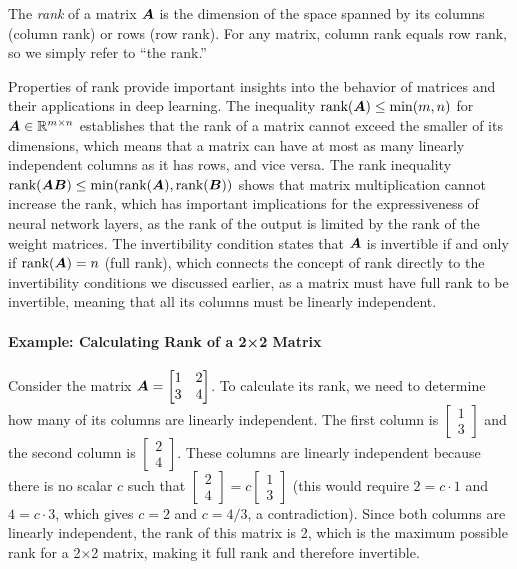\begin{definition}[Rank]
The \emph{rank} of a matrix $\boldsymbol{A}$ is the dimension of the space spanned by its columns (column rank) or rows (row rank). For any matrix, column rank equals row rank, so we simply refer to ``the rank.''
\end{definition}

Properties of rank provide important insights into the behavior of matrices and their applications in deep learning. The inequality $\text{rank}(\boldsymbol{A}) \leq \min(m, n)$ for $\boldsymbol{A} \in \mathbb{R}^{m \times n}$ establishes that the rank of a matrix cannot exceed the smaller of its dimensions, which means that a matrix can have at most as many linearly independent columns as it has rows, and vice versa. The rank inequality $\text{rank}(\boldsymbol{AB}) \leq \min(\text{rank}(\boldsymbol{A}), \text{rank}(\boldsymbol{B}))$ shows that matrix multiplication cannot increase the rank, which has important implications for the expressiveness of neural network layers, as the rank of the output is limited by the rank of the weight matrices. The invertibility condition states that $\boldsymbol{A}$ is invertible if and only if $\text{rank}(\boldsymbol{A}) = n$ (full rank), which connects the concept of rank directly to the invertibility conditions we discussed earlier, as a matrix must have full rank to be invertible, meaning that all its columns must be linearly independent.

\paragraph{Example: Calculating Rank of a 2×2 Matrix}
Consider the matrix $\boldsymbol{A} = \begin{bmatrix} 1 & 2 \\ 3 & 4 \end{bmatrix}$. To calculate its rank, we need to determine how many of its columns are linearly independent. The first column is $\begin{bmatrix} 1 \\ 3 \end{bmatrix}$ and the second column is $\begin{bmatrix} 2 \\ 4 \end{bmatrix}$. These columns are linearly independent because there is no scalar $c$ such that $\begin{bmatrix} 2 \\ 4 \end{bmatrix} = c\begin{bmatrix} 1 \\ 3 \end{bmatrix}$ (this would require $2 = c \cdot 1$ and $4 = c \cdot 3$, which gives $c = 2$ and $c = 4/3$, a contradiction). Since both columns are linearly independent, the rank of this matrix is 2, which is the maximum possible rank for a 2×2 matrix, making it full rank and therefore invertible.

